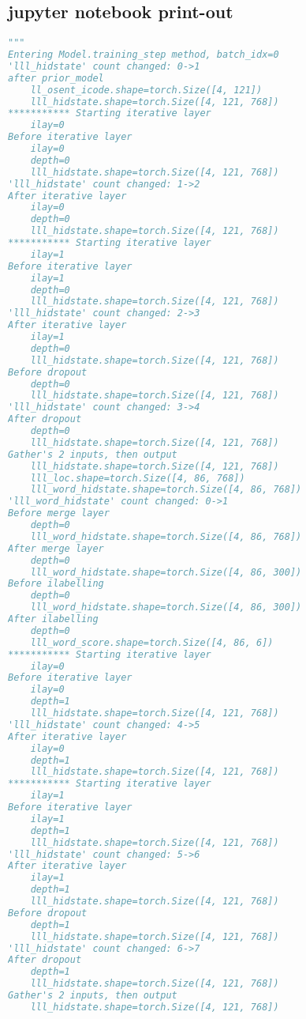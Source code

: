 \documentclass[12pt]{article}
\begin{document}
\subsection{jupyter notebook print-out}


\begin{lstlisting}[language=Python]
"""
Entering Model.training_step method, batch_idx=0
'lll_hidstate' count changed: 0->1
after prior_model
    ll_osent_icode.shape=torch.Size([4, 121])
    lll_hidstate.shape=torch.Size([4, 121, 768])
*********** Starting iterative layer
    ilay=0
Before iterative layer
    ilay=0
    depth=0
    lll_hidstate.shape=torch.Size([4, 121, 768])
'lll_hidstate' count changed: 1->2
After iterative layer
    ilay=0
    depth=0
    lll_hidstate.shape=torch.Size([4, 121, 768])
*********** Starting iterative layer
    ilay=1
Before iterative layer
    ilay=1
    depth=0
    lll_hidstate.shape=torch.Size([4, 121, 768])
'lll_hidstate' count changed: 2->3
After iterative layer
    ilay=1
    depth=0
    lll_hidstate.shape=torch.Size([4, 121, 768])
Before dropout
    depth=0
    lll_hidstate.shape=torch.Size([4, 121, 768])
'lll_hidstate' count changed: 3->4
After dropout
    depth=0
    lll_hidstate.shape=torch.Size([4, 121, 768])
Gather's 2 inputs, then output
    lll_hidstate.shape=torch.Size([4, 121, 768])
    lll_loc.shape=torch.Size([4, 86, 768])
    lll_word_hidstate.shape=torch.Size([4, 86, 768])
'lll_word_hidstate' count changed: 0->1
Before merge layer
    depth=0
    lll_word_hidstate.shape=torch.Size([4, 86, 768])
After merge layer
    depth=0
    lll_word_hidstate.shape=torch.Size([4, 86, 300])
Before ilabelling
    depth=0
    lll_word_hidstate.shape=torch.Size([4, 86, 300])
After ilabelling
    depth=0
    lll_word_score.shape=torch.Size([4, 86, 6])
*********** Starting iterative layer
    ilay=0
Before iterative layer
    ilay=0
    depth=1
    lll_hidstate.shape=torch.Size([4, 121, 768])
'lll_hidstate' count changed: 4->5
After iterative layer
    ilay=0
    depth=1
    lll_hidstate.shape=torch.Size([4, 121, 768])
*********** Starting iterative layer
    ilay=1
Before iterative layer
    ilay=1
    depth=1
    lll_hidstate.shape=torch.Size([4, 121, 768])
'lll_hidstate' count changed: 5->6
After iterative layer
    ilay=1
    depth=1
    lll_hidstate.shape=torch.Size([4, 121, 768])
Before dropout
    depth=1
    lll_hidstate.shape=torch.Size([4, 121, 768])
'lll_hidstate' count changed: 6->7
After dropout
    depth=1
    lll_hidstate.shape=torch.Size([4, 121, 768])
Gather's 2 inputs, then output
    lll_hidstate.shape=torch.Size([4, 121, 768])

\end{lstlisting}
\end{document}
